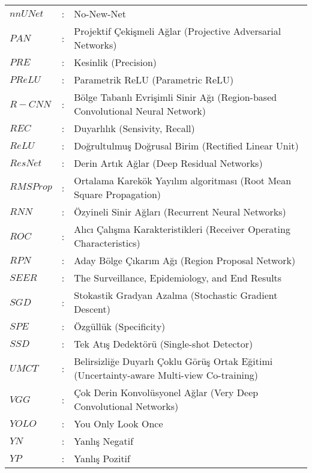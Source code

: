 \begin{longtable}{p{3.5cm}p{0.2cm}p{9.5cm}}
    $nnUNet $ & : &  No-New-Net \\
    $PAN $ & : &  Projektif Çekişmeli Ağlar (Projective Adversarial Networks) \\
    $PRE $ & : &  Kesinlik (Precision) \\
    $PReLU $ & : &  Parametrik ReLU (Parametric ReLU) \\
    $R-CNN $ & : &  Bölge Tabanlı Evrişimli Sinir Ağı (Region-based Convolutional Neural Network) \\
    $REC $ & : &  Duyarlılık (Sensivity, Recall) \\
    $ReLU $ & : &  Doğrultulmuş Doğrusal Birim (Rectified Linear Unit) \\
    $ResNet $ & : &  Derin Artık Ağlar (Deep Residual Networks) \\
    $RMSProp $ & : &  Ortalama Karekök Yayılım algoritması (Root Mean Square Propagation) \\
    $RNN $ & : &  Özyineli Sinir Ağları (Recurrent Neural Networks) \\
    $ROC $ & : &  Alıcı Çalışma Karakteristikleri (Receiver Operating Characteristics) \\
    $RPN $ & : &  Aday Bölge Çıkarım Ağı (Region Proposal Network) \\
    $SEER $ & : &  The Surveillance, Epidemiology, and End Results \\
    $SGD $ & : &  Stokastik Gradyan Azalma (Stochastic Gradient Descent) \\
    $SPE $ & : &  Özgüllük (Specificity) \\
    $SSD $ & : &  Tek Atış Dedektörü (Single-shot Detector) \\
    $UMCT $ & : &  Belirsizliğe Duyarlı Çoklu Görüş Ortak Eğitimi (Uncertainty-aware Multi-view     Co-training) \\
    $VGG $ & : &  Çok Derin Konvolüsyonel Ağlar (Very Deep Convolutional Networks) \\
    $YOLO $ & : &  You Only Look Once \\
    $YN $ & : &  Yanlış Negatif \\
    $YP $ & : &  Yanlış Pozitif \\        
\end{longtable}

